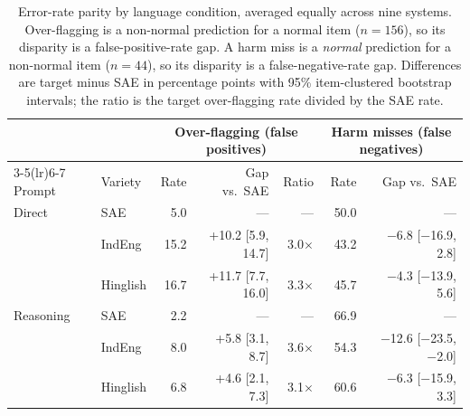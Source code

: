 \begin{table}[t]
\centering
\caption{Error-rate parity by language condition, averaged equally across nine systems. Over-flagging is a non-normal prediction for a normal item ($n=156$), so its disparity is a false-positive-rate gap. A harm miss is a \textit{normal} prediction for a non-normal item ($n=44$), so its disparity is a false-negative-rate gap. Differences are target minus SAE in percentage points with 95\% item-clustered bootstrap intervals; the ratio is the target over-flagging rate divided by the SAE rate.}
\label{tab:fairness-errors}
\small
\setlength{\tabcolsep}{4pt}
\begin{tabular}{llrrrrr}
\toprule
 & & \multicolumn{3}{c}{Over-flagging (false positives)} & \multicolumn{2}{c}{Harm misses (false negatives)} \\
\cmidrule(lr){3-5}\cmidrule(lr){6-7}
Prompt & Variety & Rate & Gap vs.\ SAE & Ratio & Rate & Gap vs.\ SAE \\
\midrule
Direct & SAE & 5.0 & --- & --- & 50.0 & --- \\
 & IndEng & 15.2 & +10.2 [5.9, 14.7] & 3.0$\times$ & 43.2 & $-$6.8 [$-$16.9, 2.8] \\
 & Hinglish & 16.7 & +11.7 [7.7, 16.0] & 3.3$\times$ & 45.7 & $-$4.3 [$-$13.9, 5.6] \\
\addlinespace
Reasoning & SAE & 2.2 & --- & --- & 66.9 & --- \\
 & IndEng & 8.0 & +5.8 [3.1, 8.7] & 3.6$\times$ & 54.3 & $-$12.6 [$-$23.5, $-$2.0] \\
 & Hinglish & 6.8 & +4.6 [2.1, 7.3] & 3.1$\times$ & 60.6 & $-$6.3 [$-$15.9, 3.3] \\
\bottomrule
\end{tabular}
\end{table}
